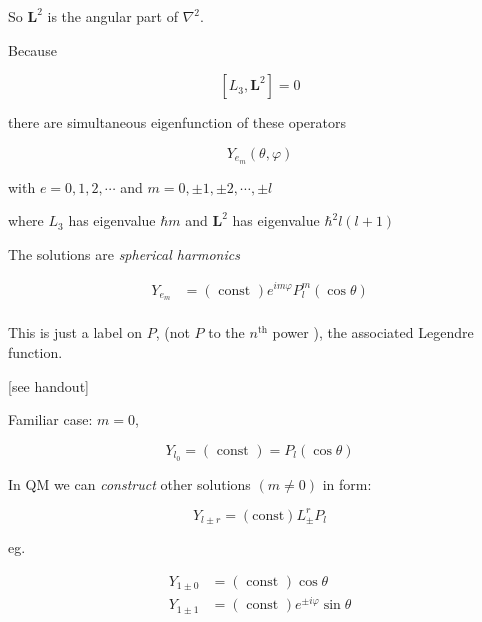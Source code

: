 \documentclass[a4paper]{article}
\begin{document}
\begin{enumerate}
So $ \mathbf{L}^{2} $ is the angular part of $ \nabla^{2} $.

Because

\[ [L_{3},\mathbf{L}^{2}] = 0 \]

there are simultaneous eigenfunction of these operators

\[ Y_{e_{m}} (\theta, \varphi) \]

with $ e = 0,1,2,\cdots $ and $ m = 0,\pm 1, \pm 2, \cdots, \pm l $

where $ L_{3} $ has eigenvalue $ \hbar m $ and $ \mathbf{L}^{2} $ has eigenvalue $ \hbar^{2} l(l + 1) $

The solutions are \emph{spherical harmonics}

\begin{align*}
Y_{e_{m}} & = (\text{ const }) e^{i m \varphi} P_{l}^{m} ( \cos \theta)  \\
\end{align*}

This is just a label on $ P $, (not $ P $ to the $ n^{\text{th}} $ power ), the associated Legendre function.

[see handout]

Familiar case: $ m = 0 $,

\[ Y_{l_{0}} = ( \text{ const } )  = P_{l}(\cos \theta)    \]

In QM we can \emph{construct} other solutions $ (m \neq 0) $ in form:

\[ Y_{l \pm r}  = ( \text{const} ) L_{\pm}^{r}  P_{l} \]

eg.

\begin{align*}
Y_{1 \pm 0} & = ( \text{ const } ) \cos \theta  \\
Y_{1 \pm 1}& = ( \text{ const } ) e^{\pm i \varphi} \sin \theta
\end{align*}




	
\end{enumerate}









  
\end{document}
